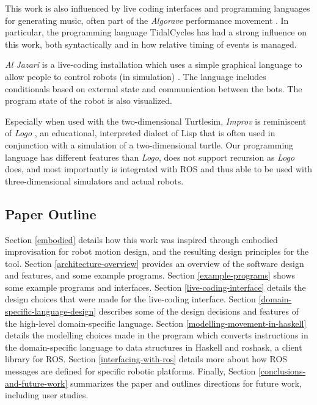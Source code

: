 \documentclass[sigconf]{acmart}
\begin{document}
This work is also influenced by live coding interfaces and programming languages
for generating music, often part of the \emph{Algorave} performance movement
\cite{collins2014algorave}. In particular, the programming language TidalCycles
\cite{mclean2010tidal} has had a strong influence on this work, both
syntactically and in how relative timing of events is managed.

\emph{Al Jazari} is a live-coding installation which uses a simple graphical
language to allow people to control robots (in simulation)
\cite{mclean2010visualisation}. The language includes conditionals based on
external state and communication between the bots. The program state of the
robot is also visualized.

Especially when used with the two-dimensional Turtlesim, \emph{Improv}
is reminiscent of \emph{Logo} \cite{logo}, an educational, interpreted
dialect of Lisp that is often used in conjunction with a simulation of a
two-dimensional turtle. Our programming language has different features
than \emph{Logo}, does not support recursion as \emph{Logo} does, and
most importantly is integrated with ROS and thus able to be used with
three-dimensional simulators and actual robots.

\subsection{Paper Outline}

Section \ref{embodied} details how this work was inspired through embodied
improvisation for robot motion design, and the resulting design principles for
the tool.
Section
\ref{architecture-overview} provides an overview of the software design and
features, and some example programs. Section \ref{example-programs} shows some example programs and
interfaces. Section \ref{live-coding-interface} details the design choices that
were made for the live-coding interface. Section
\ref{domain-specific-language-design} describes some of the design decisions and
features of the high-level domain-specific language. Section
\ref{modelling-movement-in-haskell} details the modelling choices made in the
program which converts instructions in the domain-specific language to data
structures in Haskell and roshask, a client library for ROS.
Section \ref{interfacing-with-ros} details more about how ROS messages are
defined for specific robotic platforms. Finally, Section
\ref{conclusions-and-future-work} summarizes the paper and outlines directions
for future work, including user studies.
\end{document}
